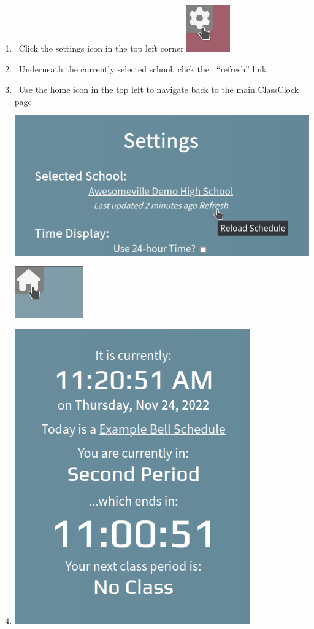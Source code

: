 \documentclass{article}
\begin{document}
\begin{enumerate}
\item {\ Click the settings icon in the top left corner}
\includegraphics[width=0.7398in,height=0.7917in]{Mini20Manual-img014.png}
\item {\ Underneath the currently selected school, click the \ “refresh” link }
\item {\ Use the home icon in the top left to navigate back to the main ClassClock page}
\includegraphics[width=5.511in,height=2.6335in]{Mini20Manual-img015.png}
\includegraphics[width=1.1661in,height=0.8846in]{Mini20Manual-img016.png}
\item {}
\includegraphics[width=3.9992in,height=4.9992in]{Mini20Manual-img002.png}
\end{enumerate}
\end{document}
